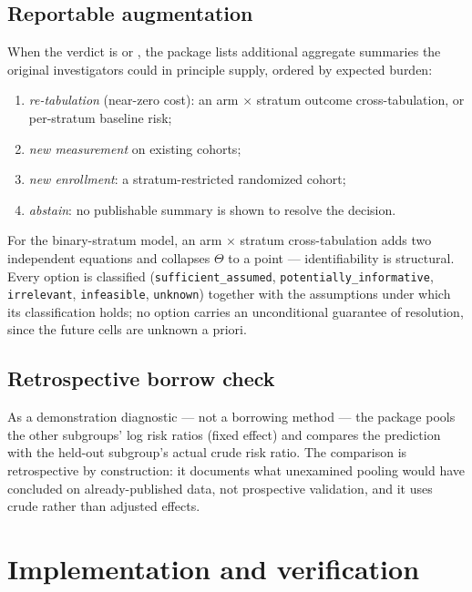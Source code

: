 \documentclass[article]{ajs}
\begin{document}
\subsection{Reportable augmentation}
\label{sec:aug}

When the verdict is  or , the package
lists additional aggregate summaries the original investigators could in
principle supply, ordered by expected burden:

\begin{enumerate}
\item \emph{re-tabulation} (near-zero cost): an arm $\times$ stratum
      outcome cross-tabulation, or per-stratum baseline risk;
\item \emph{new measurement} on existing cohorts;
\item \emph{new enrollment}: a stratum-restricted randomized cohort;
\item \emph{abstain}: no publishable summary is shown to resolve the
      decision.
\end{enumerate}

For the binary-stratum model, an arm $\times$ stratum cross-tabulation
adds two independent equations and collapses $\Theta$ to a point ---
identifiability is structural. Every option is classified
(\texttt{sufficient\_assumed}, \texttt{potentially\_informative},
\texttt{irrelevant}, \texttt{infeasible}, \texttt{unknown}) together with
the assumptions under which its classification holds; no option carries
an unconditional guarantee of resolution, since the future cells are
unknown a priori.

\subsection{Retrospective borrow check}

As a demonstration diagnostic --- not a borrowing method --- the package
pools the other subgroups' log risk ratios (fixed effect) and compares
the prediction with the held-out subgroup's actual crude risk ratio. The
comparison is retrospective by construction: it documents what unexamined
pooling would have concluded on already-published data, not prospective
validation, and it uses crude rather than adjusted effects.

\section{Implementation and verification}
\label{sec:impl}
\end{document}
